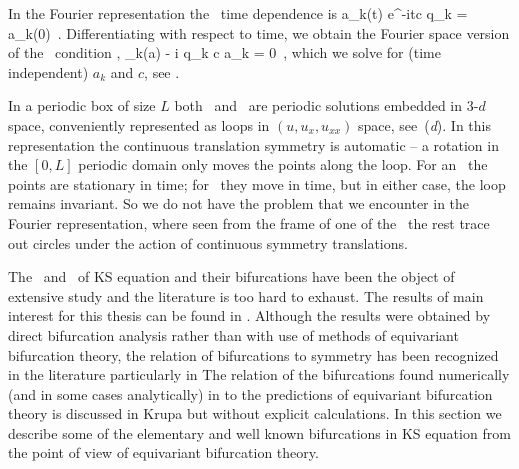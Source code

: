 In the Fourier representation the \reqva\ time dependence is
\beq
 a_k(t) e^{-itc q_k} = a_k(0)
\,.
Differentiating with respect to time, we obtain
the Fourier space version of the \reqv\ condition
,
\beq
 \pVeloc_k(a) - i q_k c a_k = 0
\,,
which we solve for (time independent) $a_k$ and $c$, see .

In a periodic box of size $L$
both \eqva\ and \reqva\ are  periodic solutions
embedded in 3-$d$ space, conveniently represented as loops in
$(u,u_x,u_{xx})$ space, see \,(\textit{d}).
In this representation the continuous translation symmetry
is automatic -- a rotation in the $[0,L]$ periodic domain only
moves the points along the loop. For an \eqv\ the points
are stationary in time; for \reqv\ they move in time, but in
either case, the loop remains invariant.
So we do not have the problem that we encounter in the Fourier
representation, where seen from the frame of one of the \eqva\
the rest trace out circles under the action of continuous symmetry
translations.

The  \eqva\ and \reqva\ of KS equation and their bifurcations have been
the object of extensive study and the literature is too hard to
exhaust. The results of main interest for this thesis can be
found in .
Although the results were obtained by direct bifurcation
analysis rather than with use of methods of equivariant
bifurcation theory, the relation of bifurcations to 
symmetry has been recognized in the literature particularly in
 The relation of the bifurcations
found numerically (and in some cases analytically) in
 to the predictions of equivariant bifurcation
theory is discussed in Krupa but
without explicit calculations. In this section we describe some
of the elementary and well known bifurcations in KS equation
from the point of view of equivariant bifurcation theory.

